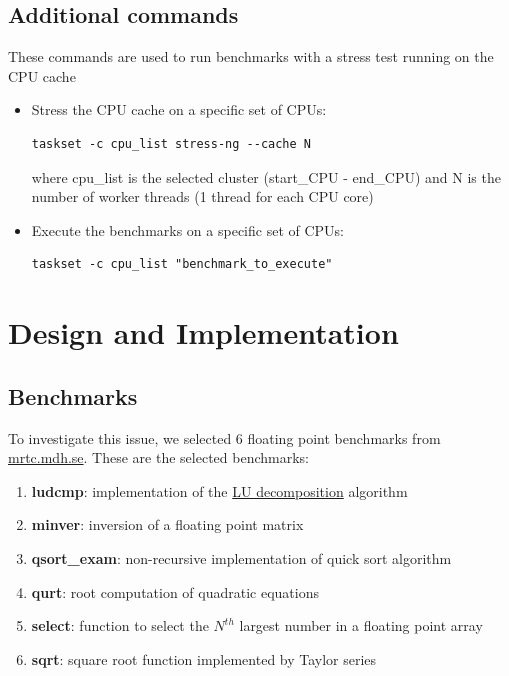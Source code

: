 \subsection{Additional commands}

These commands are used to run benchmarks with a stress test running on the CPU cache

\begin{itemize}
	\item Stress the CPU cache on a specific set of CPUs:\begin{verbatim}taskset -c cpu_list stress-ng --cache N \end{verbatim} where cpu\_list is the selected cluster (start\_CPU - end\_CPU) and N is the number of worker threads (1 thread for each CPU core)
	\item Execute the benchmarks on a specific set of CPUs: \begin{verbatim}taskset -c cpu_list "benchmark_to_execute"\end{verbatim}
\end{itemize}
\clearpage
\section{Design and Implementation}

\subsection{Benchmarks}

To investigate this issue, we selected 6 floating point benchmarks from \href{http://www.mrtc.mdh.se/projects/wcet/benchmarks.html}{mrtc.mdh.se}.
These are the selected benchmarks:
\begin{enumerate}
	\item \textbf{ludcmp}: implementation of the \href{https://en.wikipedia.org/wiki/LU_decomposition}{LU decomposition} algorithm
	\item \textbf{minver}: inversion of a floating point matrix
	\item \textbf{qsort\_exam}: non-recursive implementation of quick sort algorithm
	\item \textbf{qurt}: root computation of quadratic equations
	\item \textbf{select}: function to select the ${N}^{th}$ largest number in a floating point array
	\item \textbf{sqrt}: square root function implemented by Taylor series
\end{enumerate}

